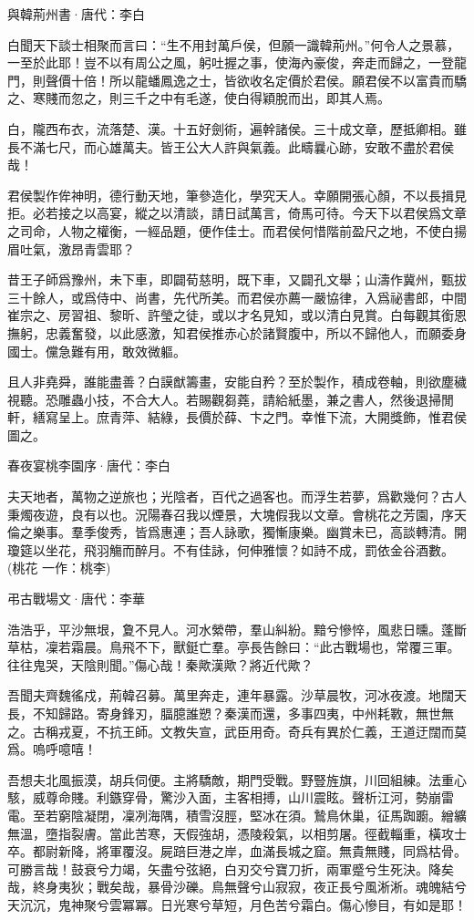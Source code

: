 \documentclass[12pt,a4paper]{ctexbook}
\begin{document}
與韓荊州書·唐代：李白 \par
白聞天下談士相聚而言曰：“生不用封萬戶侯，但願一識韓荊州。”何令人之景慕，一至於此耶！豈不以有周公之風，躬吐握之事，使海內豪俊，奔走而歸之，一登龍門，則聲價十倍！所以龍蟠鳳逸之士，皆欲收名定價於君侯。願君侯不以富貴而驕之、寒賤而忽之，則三千之中有毛遂，使白得穎脫而出，即其人焉。\par
白，隴西布衣，流落楚、漢。十五好劍術，遍幹諸侯。三十成文章，歷抵卿相。雖長不滿七尺，而心雄萬夫。皆王公大人許與氣義。此疇曩心跡，安敢不盡於君侯哉！\par
君侯製作侔神明，德行動天地，筆參造化，學究天人。幸願開張心顏，不以長揖見拒。必若接之以高宴，縱之以清談，請日試萬言，倚馬可待。今天下以君侯爲文章之司命，人物之權衡，一經品題，便作佳士。而君侯何惜階前盈尺之地，不使白揚眉吐氣，激昂青雲耶？\par
昔王子師爲豫州，未下車，即闢荀慈明，既下車，又闢孔文舉；山濤作冀州，甄拔三十餘人，或爲侍中、尚書，先代所美。而君侯亦薦一嚴協律，入爲祕書郎，中間崔宗之、房習祖、黎昕、許瑩之徒，或以才名見知，或以清白見賞。白每觀其銜恩撫躬，忠義奮發，以此感激，知君侯推赤心於諸賢腹中，所以不歸他人，而願委身國士。儻急難有用，敢效微軀。\par
且人非堯舜，誰能盡善？白謨猷籌畫，安能自矜？至於製作，積成卷軸，則欲塵穢視聽。恐雕蟲小技，不合大人。若賜觀芻蕘，請給紙墨，兼之書人，然後退掃閒軒，繕寫呈上。庶青萍、結綠，長價於薛、卞之門。幸惟下流，大開獎飾，惟君侯圖之。\par
春夜宴桃李園序·唐代：李白 \par
夫天地者，萬物之逆旅也；光陰者，百代之過客也。而浮生若夢，爲歡幾何？古人秉燭夜遊，良有以也。況陽春召我以煙景，大塊假我以文章。會桃花之芳園，序天倫之樂事。羣季俊秀，皆爲惠連；吾人詠歌，獨慚康樂。幽賞未已，高談轉清。開瓊筵以坐花，飛羽觴而醉月。不有佳詠，何伸雅懷？如詩不成，罰依金谷酒數。(桃花 一作：桃李)\par
弔古戰場文·唐代：李華 \par
浩浩乎，平沙無垠，夐不見人。河水縈帶，羣山糾紛。黯兮慘悴，風悲日曛。蓬斷草枯，凜若霜晨。鳥飛不下，獸鋌亡羣。亭長告餘曰：“此古戰場也，常覆三軍。往往鬼哭，天陰則聞。”傷心哉！秦歟漢歟？將近代歟？\par
吾聞夫齊魏徭戍，荊韓召募。萬里奔走，連年暴露。沙草晨牧，河冰夜渡。地闊天長，不知歸路。寄身鋒刃，腷臆誰愬？秦漢而還，多事四夷，中州耗斁，無世無之。古稱戎夏，不抗王師。文教失宣，武臣用奇。奇兵有異於仁義，王道迂闊而莫爲。嗚呼噫嘻！\par
吾想夫北風振漠，胡兵伺便。主將驕敵，期門受戰。野豎旌旗，川回組練。法重心駭，威尊命賤。利鏃穿骨，驚沙入面，主客相搏，山川震眩。聲析江河，勢崩雷電。至若窮陰凝閉，凜冽海隅，積雪沒脛，堅冰在須。鷙鳥休巢，征馬踟躕。繒纊無溫，墮指裂膚。當此苦寒，天假強胡，憑陵殺氣，以相剪屠。徑截輜重，橫攻士卒。都尉新降，將軍覆沒。屍踣巨港之岸，血滿長城之窟。無貴無賤，同爲枯骨。可勝言哉！鼓衰兮力竭，矢盡兮弦絕，白刃交兮寶刀折，兩軍蹙兮生死決。降矣哉，終身夷狄；戰矣哉，暴骨沙礫。鳥無聲兮山寂寂，夜正長兮風淅淅。魂魄結兮天沉沉，鬼神聚兮雲冪冪。日光寒兮草短，月色苦兮霜白。傷心慘目，有如是耶！\par
\end{document}
